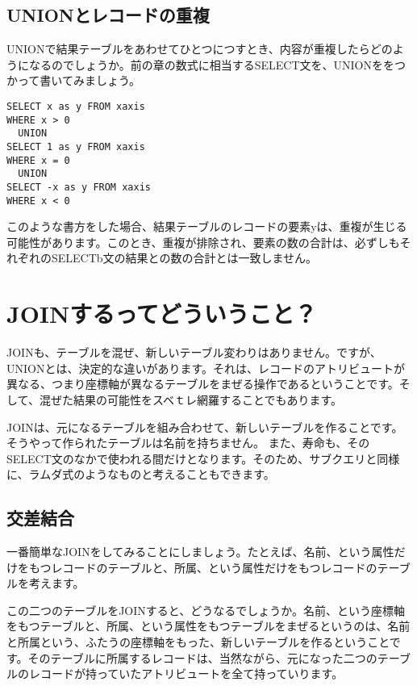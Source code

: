 \subsection{UNIONとレコードの重複}

UNIONで結果テーブルをあわせてひとつにつすとき、内容が重複したらどのようになるのでしょうか。前の章の数式に相当するSELECT文を、UNIONををつかって書いてみましょう。

\begin{verbatim}
SELECT x as y FROM xaxis
WHERE x > 0
  UNION
SELECT 1 as y FROM xaxis
WHERE x = 0
  UNION
SELECT -x as y FROM xaxis
WHERE x < 0
\end{verbatim}

このような書方をした場合、結果テーブルのレコードの要素yは、重複が生じる可能性があります。このとき、重複が排除され、要素の数の合計は、必ずしもそれぞれのSELECTb文の結果との数の合計とは一致しません。

\section{JOINするってどういうこと？}

JOINも、テーブルを混ぜ、新しいテーブル変わりはありません。ですが、UNIONとは、決定的な違いがあります。それは、レコードのアトリビュートが異なる、つまり座標軸が異なるテーブルをまぜる操作であるということです。そして、混ぜた結果の可能性をスベｔレ網羅することでもあります。

JOINは、元になるテーブルを組み合わせて、新しいテーブルを作ることです。そうやって作られたテーブルは名前を持ちません。
また、寿命も、そのSELECT文のなかで使われる間だけとなります。そのため、サブクエリと同様に、ラムダ式のようなものと考えることもできます。

\subsection{交差結合}

一番簡単なJOINをしてみることにしましょう。たとえば、名前、という属性だけをもつレコードのテーブルと、所属、という属性だけをもつレコードのテーブルを考えます。

この二つのテーブルをJOINすると、どうなるでしょうか。名前、という座標軸をもつテーブルと、所属、という属性をもつテーブルをまぜるというのは、名前と所属という、ふたうの座標軸をもった、新しいテーブルを作るということです。そのテーブルに所属するレコードは、当然ながら、元になった二つのテーブルのレコードが持っていたアトリビュートを全て持っていります。

